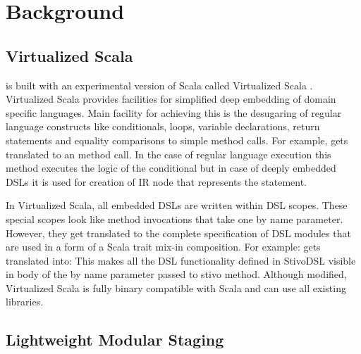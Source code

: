 \section{Background}
\label{sec:background}

\subsection{Virtualized Scala}
\label{subsec:virtualized-scala}
\tool is built with an experimental version of Scala called Virtualized Scala \cite{sv}. Virtualized Scala provides facilities for simplified deep embedding of domain specific languages. Main facility for achieving this is the desugaring of regular language constructs like conditionals, loops, variable declarations, return statements and equality comparisons to simple method calls. For example,  gets translated to an  method call. In the case of regular language execution this method executes the logic of the conditional but in case of deeply embedded DSLs it is used for creation of  IR node that represents the  statement.  

In Virtualized Scala, all embedded DSLs are written within DSL scopes. These special scopes look like method invocations that take one by name parameter. However, they get translated to the complete specification of DSL modules that are used in a form of a Scala trait mix-in composition. For example: 
 gets translated into:
This makes all the DSL functionality defined in StivoDSL visible in body of the by name parameter passed to stivo method. 
Although modified, Virtualized Scala is fully binary compatible with Scala and can use all existing libraries.  

  

\subsection{Lightweight Modular Staging}
\label{subsec:lightweight-modular-staging}

